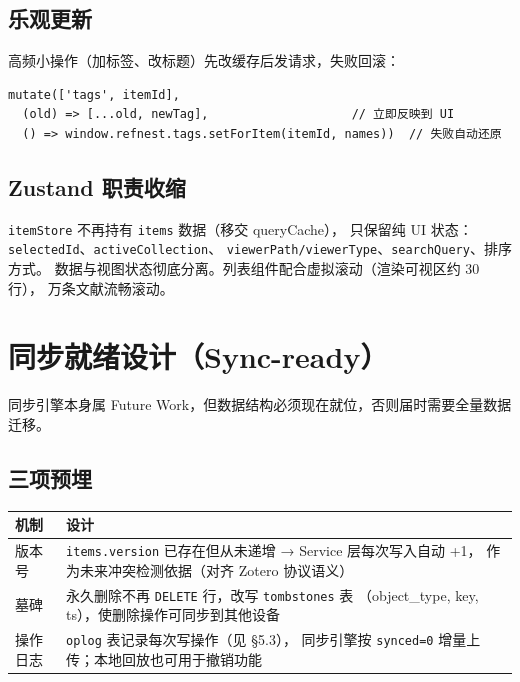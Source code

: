 \documentclass[12pt, a4paper]{article}
\begin{document}
\subsection{乐观更新}

高频小操作（加标签、改标题）先改缓存后发请求，失败回滚：

\begin{lstlisting}[language={}]
mutate(['tags', itemId],
  (old) => [...old, newTag],                    // 立即反映到 UI
  () => window.refnest.tags.setForItem(itemId, names))  // 失败自动还原
\end{lstlisting}

\subsection{Zustand 职责收缩}

\texttt{itemStore} 不再持有 \texttt{items} 数据（移交 queryCache），
只保留纯 UI 状态：\texttt{selectedId}、\texttt{activeCollection}、
\texttt{viewerPath/viewerType}、\texttt{searchQuery}、排序方式。
数据与视图状态彻底分离。列表组件配合虚拟滚动（渲染可视区约 30 行），
万条文献流畅滚动。

\section{同步就绪设计（Sync-ready）}

同步引擎本身属 Future Work，但数据结构必须现在就位，否则届时需要全量数据迁移。

\subsection{三项预埋}

\begin{center}
\begin{tabular}{p{3cm} p{9.5cm}}
  \toprule
  \textbf{机制} & \textbf{设计} \\
  \midrule
  版本号 & \texttt{items.version} 已存在但从未递增 → Service 层每次写入自动 +1，
           作为未来冲突检测依据（对齐 Zotero 协议语义） \\
  墓碑 & 永久删除不再 \texttt{DELETE} 行，改写 \texttt{tombstones} 表
         （object\_type, key, ts），使删除操作可同步到其他设备 \\
  操作日志 & \texttt{oplog} 表记录每次写操作（见 \S5.3），
             同步引擎按 \texttt{synced=0} 增量上传；本地回放也可用于撤销功能 \\
  \bottomrule
\end{tabular}
\end{center}
\end{document}
